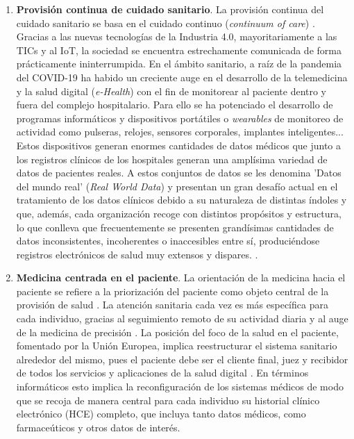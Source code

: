 
\begin{enumerate}

\item \textbf{Provisión continua de cuidado sanitario}. La provisión continua del cuidado sanitario se basa en el cuidado continuo (\textit{continuum of care}) \cite{kouroubali2019new}. Gracias a las nuevas tecnologías de la Industria 4.0, mayoritariamente a las TICs y al IoT, la sociedad se encuentra estrechamente comunicada de forma prácticamente ininterrumpida. En el ámbito sanitario, a raíz de la pandemia del COVID-19 ha habido un creciente auge en el desarrollo de la telemedicina y la salud digital (\textit{e-Health}) \cite{martin2021ehealth} con el fin de monitorear al paciente dentro y fuera del complejo hospitalario. Para ello se ha potenciado el desarrollo de programas informáticos y dispositivos portátiles o \textit{wearables} de monitoreo de actividad como pulseras, relojes, sensores corporales, implantes inteligentes... Estos dispositivos generan enormes cantidades de datos médicos que junto a los registros clínicos de los hospitales generan una amplísima variedad de datos de pacientes reales. A estos conjuntos de datos se les denomina 'Datos del mundo real' (\textit{Real World Data}) y presentan un gran desafío actual en el tratamiento de los datos clínicos debido a su naturaleza de distintas índoles y que, además, cada organización recoge con distintos propósitos y estructura, lo que conlleva que frecuentemente se presenten grandísimas cantidades de datos inconsistentes, incoherentes o inaccesibles entre sí, produciéndose registros electrónicos de salud muy extensos y dispares. \cite{kouroubali2019new}.

\item \textbf{Medicina centrada en el paciente}. La orientación de la medicina hacia el paciente se refiere a la priorización del paciente como objeto central de la provisión de salud  \cite{tortorella2020healthcare}. La atención sanitaria cada vez es más específica para cada individuo, gracias al seguimiento remoto de su actividad diaria y al auge de la medicina de precisión \cite{ruiz2023inteligencia}. La posición del foco de la salud en el paciente, fomentado por la Unión Europea,  implica reestructurar el sistema sanitario alrededor del mismo, pues el paciente debe ser el cliente final, juez y recibidor de todos los servicios y aplicaciones de la salud digital \cite{ntafi2022legal} \cite{katehakis2019framework}. En términos informáticos esto implica la reconfiguración de los sistemas médicos de modo que se recoja de manera central para cada individuo su historial clínico electrónico (HCE) completo, que incluya tanto datos médicos, como farmaceúticos y otros datos de interés.  


\end{enumerate}
